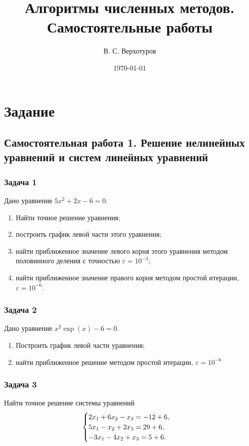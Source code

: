 \documentclass[10pt, a4paper, titlepage]{article}
\title{Алгоритмы численных методов. \\ Самостоятельные работы}
\author{В. С. Верхотуров}
\affil{БСБО-05-20}
\affil{РТУ МИРЭА}
\date\today
\begin{document}
\maketitle
\tableofcontents
\newpage

\section*{Задание}

\subsection*{Самостоятельная работа \textnumero{} 1. Решение нелинейных уравнений и систем линейных уравнений}

\subsubsection*{Задача 1}
Дано уравнение $5x^2+2x-6=0$.
\begin{enumerate}
    \item Найти точное решение уравнения;
    \item построить график левой части этого уравнения;
    \item найти приближенное значение левого корня этого уравнения методом половинного деления с точностью $\varepsilon=10^{-3}$;
    \item найти приближенное значение правого корня методом простой итерации, $\varepsilon=10^{-6}$.
\end{enumerate}

\subsubsection*{Задача 2}
Дано уравнение $x^2\exp(x)-6=0$.
\begin{enumerate}
    \item Построить график левой части уравнения;
    \item найти приближенное решение методом простой итерации, $\varepsilon=10^{-6}$
\end{enumerate}

\subsubsection*{Задача 3}
Найти точное решение системы уравнений
\begin{equation*}
    \begin{cases}
        $$2x_1+6x_2-x_3 = -12+6$$, \\
        $$5x_1-x_2+2x_3 = 29+6$$, \\
        $$-3x_1-4x_2+x_3 = 5+6$$.
    \end{cases}
\end{equation*}
\end{document}
